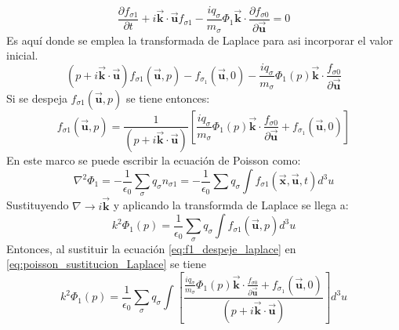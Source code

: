 \documentclass[../tesis_main_file.tex]{subfiles}
\begin{document}
\begin{equation}
\frac{\partial f_{\sigma 1}}{\partial t}+ i\overrightarrow{\textbf{k}}\cdot \overrightarrow{\textbf{u}}f_{\sigma 1}-\frac{i q_{\sigma}}{m_{\sigma}}\Phi _1 \overrightarrow{\textbf{k}}\cdot \frac{\partial f_{\sigma 0}}{\partial \overrightarrow{\textbf{u}}}=0
\end{equation}
Es aquí donde se emplea la transformada de Laplace para asi incorporar el valor inicial.
\begin{equation}
(p + i\overrightarrow{\textbf{k}}\cdot \overrightarrow{\textbf{u}})f_{\sigma 1}(\overrightarrow{\textbf{u}},p)- f_{\sigma _1}(\overrightarrow{\textbf{u}},0)-\frac{i q_{\sigma}}{m_{\sigma}}\Phi _1(p)\overrightarrow{\textbf{k}}\cdot \frac{f_{\sigma 0}}{\partial \overrightarrow{\textbf{u}}}
\end{equation}
Si se despeja $f_{\sigma 1}(\overrightarrow{\textbf{u}},p)$ se tiene entonces:
\begin{equation}
\label{eq:f1_despeje_laplace}
f_{\sigma 1}(\overrightarrow{\textbf{u}},p)=\frac{1}{(p + i\overrightarrow{\textbf{k}}\cdot \overrightarrow{\textbf{u}})}\left[\frac{i q_{\sigma}}{m_{\sigma}}\Phi _1(p)\overrightarrow{\textbf{k}}\cdot \frac{f_{\sigma 0}}{\partial \overrightarrow{\textbf{u}}} + f_{\sigma _1}(\overrightarrow{\textbf{u}},0)\right]
\end{equation}
En este marco se puede escribir la ecuación de Poisson como:
\begin{equation}
\nabla ^2 \Phi _1 =- \frac{1}{\epsilon_0}\sum_{\sigma} q_{\sigma}n_{\sigma 1}= - \frac{1}{\epsilon_0}\sum q_{\sigma} \int f_{\sigma 1}(\overrightarrow{\textbf{x}},\overrightarrow{\textbf{u}},t)d^3u
\end{equation}
Sustituyendo $\nabla \rightarrow i \overrightarrow{\textbf{k}}$ y aplicando la transformda de Laplace se llega a:
\begin{equation}
\label{eq:poisson_sustitucion_Laplace}
k^2 \Phi _1(p)=\frac{1}{\epsilon_0} \sum_{\sigma} q_{\sigma}\int f_{\sigma 1}(\overrightarrow{\textbf{u}},p)d^3u
\end{equation}
Entonces, al sustituir la ecuación \ref{eq:f1_despeje_laplace} en \ref{eq:poisson_sustitucion_Laplace} se tiene
\begin{equation}
k^2 \Phi _1(p)=\frac{1}{\epsilon_0}\sum_{\sigma}q_{\sigma}\int \left[\frac{\frac{i q_{\sigma}}{m_{\sigma}}\Phi _1(p)\overrightarrow{\textbf{k}}\cdot \frac{f_{\sigma 0}}{\partial \overrightarrow{\textbf{u}}} + f_{\sigma _1}(\overrightarrow{\textbf{u}},0)}{(p + i\overrightarrow{\textbf{k}}\cdot \overrightarrow{\textbf{u}})}\right]d^3u
\end{equation}
\end{document}

